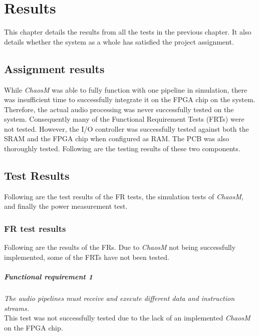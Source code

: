 \chapter{Results}\label{chapter:results}

This chapter details the results from all the tests in the previous chapter. It
also details whether the system as a whole has satisfied the project assignment.

\clearpage
\section{Assignment results}

While \textit{ChaosM} was able to fully function with one pipeline in
simulation, there was insufficient time to successfully integrate it on the FPGA
chip on the system. Therefore, the actual audio processing was never
successfully tested on the system. Consequently many of the Functional
Requirement Tests (FRTs) were not tested. However, the I/O controller was
successfully tested against both the SRAM and the FPGA chip when configured as
RAM. The PCB was also thoroughly tested. Following are the testing results of
these two components.




\clearpage
\section{Test Results}
Following are the test results of the FR tests, the simulation tests of
\textit{ChaosM}, and finally the power measurement test.

\subsection{FR test results}
Following are the results of the FRs. Due to \textit{ChaosM} not being
successfully implemented, some of the FRTs have not been tested.

\paragraph{Functional requirement 1}
\textit{The audio pipelines must receive and execute different data and instruction streams.}\\
This test was not successfully tested due to the lack of an implemented \textit{ChaosM} on the FPGA chip.


